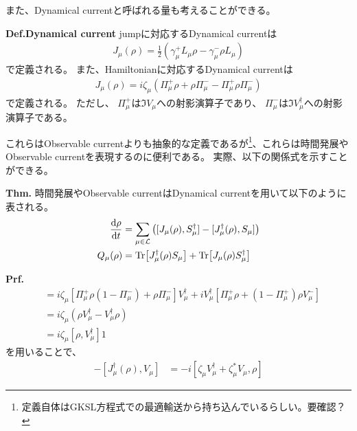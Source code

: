\documentclass[a4paper,11pt]{jsarticle}
\numberwithin{equation}{section}
\begin{document}
また、Dynamical currentと呼ばれる量も考えることができる。
\begin{itembox}[l]{\textbf{Def.Dynamical current}}
    jumpに対応するDynamical currentは
    \begin{align}
        J_{\mu}(\rho) = \frac{1}{2}(\gamma_{\mu}^{+} L_{\mu}\rho - \gamma_{\mu}^{-} \rho L_{\mu})
    \end{align}
    で定義される。
    また、Hamiltonianに対応するDynamical currentは
    \begin{align}
        J_{\mu}(\rho) = i\zeta_{\mu}(\Pi_{\mu}^{+}\rho + \rho \Pi_{\mu}^{-} - \Pi_{\mu}^{+} \rho \Pi_{\mu}^{-}) 
    \end{align}
    で定義される。
    ただし、
    $\Pi_{\mu}^{+}$は$\Im V_{\mu}$への射影演算子であり、
    $\Pi_{\mu}^{-}$は$\Im V_{\mu}^{\dagger}$への射影演算子である。
\end{itembox}
これらはObservable currentよりも抽象的な定義であるが\footnote{
    定義自体はGKSL方程式での最適輸送から持ち込んでいるらしい。要確認？
}、これらは時間発展やObservable currentを表現するのに便利である。
実際、以下の関係式を示すことができる。
\begin{itembox}[l]{\textbf{Thm.}}
    時間発展やObservable currentはDynamical currentを用いて以下のように表される。
    \begin{align}
        \dv{\rho}{t} &= \sum_{\mu \in \mathcal{L}} \left( [J_{\mu}(\rho), S_{\mu}^{\dagger}] - [J_{\mu}^{\dagger}(\rho), S_{\mu}] \right) \\
        Q_{\mu}(\rho) &= \Tr[ J_{\mu}^{\dagger}(\rho) S_{\mu} ] + \Tr[ J_{\mu}(\rho) S_{\mu}^{\dagger} ]
    \end{align}
\end{itembox}
\textbf{Prf.}\\
\begin{align}
[J_{\mu}(\rho), V_{\mu}^{\dagger}]
&= i \zeta_{\mu} 
\left[ \Pi_{\mu}^{+} \rho (1 - \Pi_{\mu}^{-}) + \rho \Pi_{\mu}^{-} \right] V_{\mu}^{\dagger}
+ i V_{\mu}^{\dagger} \left[ \Pi_{\mu}^{+} \rho + (1 - \Pi_{\mu}^{+}) \rho V_{\mu}^{-} \right] \\
&= i \zeta_{\mu} (\rho V_{\mu}^{\dagger} - V_{\mu}^{\dagger} \rho)\\
&= i \zeta_{\mu} [\rho, V_{\mu}^{\dagger}] 
1\end{align}
を用いることで、
\begin{align}
[J_{\mu}(\rho), V_{\mu}^{\dagger}] - [J_{\mu}^{\dagger}(\rho), V_{\mu}]
&= -i [\zeta_{\mu} V_{\mu}^{\dagger} + \zeta_{\mu}^{*} V_{\mu}, \rho]
\end{align}
\end{document}
